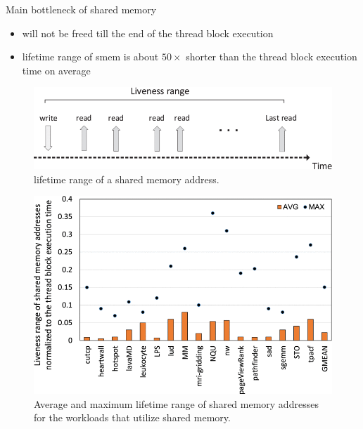 \documentclass[
    fontset=fandol,
    xcolor=svgnames %
]{ctexbeamer}
\begin{document}
\begin{frame}

    \begin{block}{Main bottleneck of shared memory}
        \begin{itemize}
            \item will not be freed till
                  the end of the thread block execution
            \item lifetime range of smem is about $50\times$ shorter than the thread block execution time on average
        \end{itemize}
    \end{block}

    \begin{figure}
        \includegraphics[width=1\textwidth]{assets/figure/sadro2-3154315-large.png}
        \caption{lifetime range of a shared memory address.}
    \end{figure}

\end{frame}

\begin{frame}

    \begin{figure}
        \includegraphics[height=0.8\textheight]{assets/figure/sadro3-3154315-large.png}
        \caption{Average and maximum lifetime range of shared memory addresses for the workloads that utilize shared memory.}
    \end{figure}

\end{frame}
\end{document}
